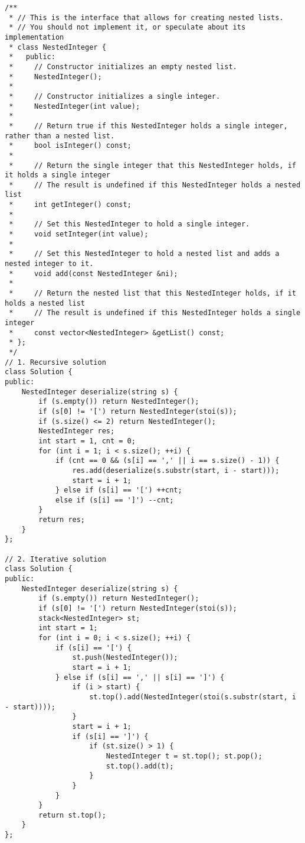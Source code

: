 \begin{lstlisting}
/**
 * // This is the interface that allows for creating nested lists.
 * // You should not implement it, or speculate about its implementation
 * class NestedInteger {
 *   public:
 *     // Constructor initializes an empty nested list.
 *     NestedInteger();
 *
 *     // Constructor initializes a single integer.
 *     NestedInteger(int value);
 *
 *     // Return true if this NestedInteger holds a single integer, rather than a nested list.
 *     bool isInteger() const;
 *
 *     // Return the single integer that this NestedInteger holds, if it holds a single integer
 *     // The result is undefined if this NestedInteger holds a nested list
 *     int getInteger() const;
 *
 *     // Set this NestedInteger to hold a single integer.
 *     void setInteger(int value);
 *
 *     // Set this NestedInteger to hold a nested list and adds a nested integer to it.
 *     void add(const NestedInteger &ni);
 *
 *     // Return the nested list that this NestedInteger holds, if it holds a nested list
 *     // The result is undefined if this NestedInteger holds a single integer
 *     const vector<NestedInteger> &getList() const;
 * };
 */
// 1. Recursive solution
class Solution {
public:
    NestedInteger deserialize(string s) {
        if (s.empty()) return NestedInteger();
        if (s[0] != '[') return NestedInteger(stoi(s));
        if (s.size() <= 2) return NestedInteger();
        NestedInteger res;
        int start = 1, cnt = 0;
        for (int i = 1; i < s.size(); ++i) {
            if (cnt == 0 && (s[i] == ',' || i == s.size() - 1)) {
                res.add(deserialize(s.substr(start, i - start)));
                start = i + 1;
            } else if (s[i] == '[') ++cnt;
            else if (s[i] == ']') --cnt;
        }
        return res;
    }
};

// 2. Iterative solution
class Solution {
public:
    NestedInteger deserialize(string s) {
        if (s.empty()) return NestedInteger();
        if (s[0] != '[') return NestedInteger(stoi(s));
        stack<NestedInteger> st;
        int start = 1;
        for (int i = 0; i < s.size(); ++i) {
            if (s[i] == '[') {
                st.push(NestedInteger());
                start = i + 1;
            } else if (s[i] == ',' || s[i] == ']') {
                if (i > start) {
                    st.top().add(NestedInteger(stoi(s.substr(start, i - start))));
                }
                start = i + 1;
                if (s[i] == ']') {
                    if (st.size() > 1) {
                        NestedInteger t = st.top(); st.pop();
                        st.top().add(t);
                    }
                }
            }
        }
        return st.top();
    }
};


\end{lstlisting}
